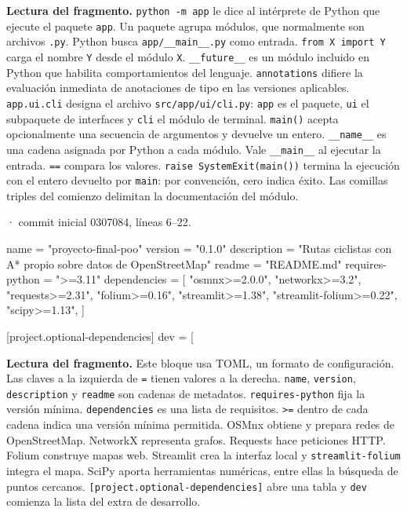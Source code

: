 \documentclass[11pt,a4paper]{article}
\begin{document}
\textbf{Lectura del fragmento.} \texttt{python -m app} le dice al intérprete de Python que ejecute el paquete \texttt{app}. Un paquete agrupa módulos, que normalmente son archivos \texttt{.py}. Python busca \texttt{app/\_\_main\_\_.py} como entrada. \texttt{from X import Y} carga el nombre \texttt{Y} desde el módulo \texttt{X}. \texttt{\_\_future\_\_} es un módulo incluido en Python que habilita comportamientos del lenguaje. \texttt{annotations} difiere la evaluación inmediata de anotaciones de tipo en las versiones aplicables. \texttt{app.ui.cli} designa el archivo \texttt{src/app/ui/cli.py}: \texttt{app} es el paquete, \texttt{ui} el subpaquete de interfaces y \texttt{cli} el módulo de terminal. \texttt{main()} acepta opcionalmente una secuencia de argumentos y devuelve un entero. \texttt{\_\_name\_\_} es una cadena asignada por Python a cada módulo. Vale \texttt{\_\_main\_\_} al ejecutar la entrada. \texttt{==} compara los valores. \texttt{raise SystemExit(main())} termina la ejecución con el entero devuelto por \texttt{main}: por convención, cero indica éxito. Las comillas triples del comienzo delimitan la documentación del módulo.


\smallskip
{\footnotesize\texttt{} · commit inicial 0307084, líneas 6--22.}\par
\begin{Codigo}[firstnumber=6]
name = "proyecto-final-poo"
version = "0.1.0"
description = "Rutas ciclistas con A* propio sobre datos de OpenStreetMap"
readme = "README.md"
requires-python = ">=3.11"
dependencies = [
    "osmnx>=2.0.0",
    "networkx>=3.2",
    "requests>=2.31",
    "folium>=0.16",
    "streamlit>=1.38",
    "streamlit-folium>=0.22",
    "scipy>=1.13",
]

[project.optional-dependencies]
dev = [
\end{Codigo}

\textbf{Lectura del fragmento.} Este bloque usa TOML, un formato de configuración. Las claves a la izquierda de \texttt{=} tienen valores a la derecha. \texttt{name}, \texttt{version}, \texttt{description} y \texttt{readme} son cadenas de metadatos. \texttt{requires-python} fija la versión mínima. \texttt{dependencies} es una lista de requisitos. \texttt{\textgreater{}=} dentro de cada cadena indica una versión mínima permitida. OSMnx obtiene y prepara redes de OpenStreetMap. NetworkX representa grafos. Requests hace peticiones HTTP. Folium construye mapas web. Streamlit crea la interfaz local y \texttt{streamlit-folium} integra el mapa. SciPy aporta herramientas numéricas, entre ellas la búsqueda de puntos cercanos. \texttt{[project.optional-dependencies]} abre una tabla y \texttt{dev} comienza la lista del extra de desarrollo.
\end{document}
